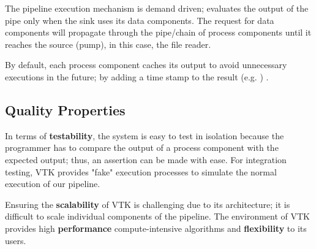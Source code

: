 The pipeline execution mechanism is demand driven;  evaluates the output of the pipe only when the sink uses its data components. The request for data components will propagate through the pipe/chain of process components until it reaches the source (pump), in this case, the file reader. 

By default, each process component caches its output to avoid unnecessary executions in the future; by adding a time stamp to the result (e.g. ) \cite{aosabook}.

\subsection{Quality Properties}

In terms of \textbf{testability}, the system is easy to test in isolation because the programmer has to compare the output of a process component with the expected output; thus, an assertion can be made with ease. For integration testing, VTK provides "fake" execution processes to simulate the normal execution of our pipeline.

Ensuring the \textbf{scalability} of VTK is challenging due to its architecture; it is difficult to scale individual components of the pipeline. The environment of VTK provides high \textbf{performance} compute-intensive algorithms and \textbf{flexibility} to its users.